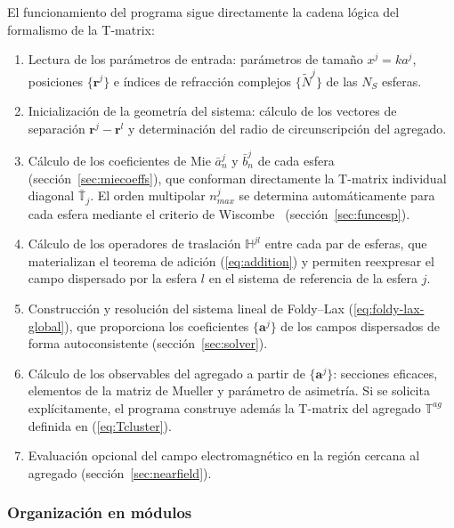 El funcionamiento del programa sigue directamente la cadena lógica del
formalismo de la T-matrix:

\begin{enumerate}
  \item Lectura de los parámetros de entrada: parámetros de tamaño
        $x^j = k a^j$, posiciones $\{\mathbf{r}^j\}$ e índices de
        refracción complejos $\{\tilde{N}^j\}$ de las $N_S$ esferas.
  \item Inicialización de la geometría del sistema: cálculo de los
        vectores de separación $\mathbf{r}^j - \mathbf{r}^l$ y
        determinación del radio de circunscripción del agregado.
  \item Cálculo de los coeficientes de Mie $\bar a_n^{j}$ y
        $\bar b_n^{j}$ de cada esfera (sección~\ref{sec:miecoeffs}), que
        conforman directamente la T-matrix individual diagonal
        $\bar{\mathbb{T}}_j$. El orden multipolar $n_{max}^{j}$ se
        determina automáticamente para cada esfera mediante el criterio
        de Wiscombe~\cite{Wiscombe1980} (sección~\ref{sec:funcesp}).
  \item Cálculo de los operadores de traslación $\mathbb{H}^{jl}$ entre
        cada par de esferas, que materializan el teorema de adición
        (\ref{eq:addition}) y permiten reexpresar el campo dispersado
        por la esfera $l$ en el sistema de referencia de la esfera $j$.
  \item Construcción y resolución del sistema lineal de Foldy--Lax
        (\ref{eq:foldy-lax-global}), que proporciona los coeficientes
        $\{\mathbf{a}^{j}\}$ de los campos dispersados de forma
        autoconsistente (sección~\ref{sec:solver}).
  \item Cálculo de los observables del agregado a partir de
        $\{\mathbf{a}^{j}\}$: secciones eficaces, elementos de la matriz
        de Mueller y parámetro de asimetría. Si se solicita
        explícitamente, el programa construye además la T-matrix del
        agregado $\mathbb{T}^{ag}$ definida en (\ref{eq:Tcluster}).
  \item Evaluación opcional del campo electromagnético en la región
        cercana al agregado (sección~\ref{sec:nearfield}).
\end{enumerate}

\subsubsection{Organización en módulos}

